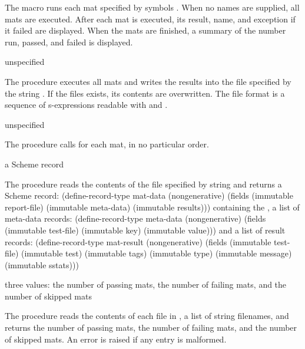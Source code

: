 The  macro runs each mat specified by symbols
 \etc.  When no names are supplied, all
mats are executed.  After each mat is executed, its result, name, and
exception if it failed are displayed.  When the mats are finished, a
summary of the number run, passed, and failed is displayed.

\begin{procedure}
\end{procedure}
\returns{} unspecified

The  procedure executes all mats and writes
the results into the file specified by the string . If
the files exists, its contents are overwritten. The file format is a
sequence of s-expressions readable with  and
.

\begin{procedure}
\end{procedure}
\returns{} unspecified

The  procedure calls  for each mat, in no particular order.

\begin{procedure}
\end{procedure}
\returns{} a Scheme record

The  procedure reads the contents of the file
specified by string  and returns a Scheme record:
\codebegin
(define-record-type mat-data
  (nongenerative)
  (fields
    (immutable report-file)
    (immutable meta-data)
    (immutable results)))
\codeend
containing the , a list of meta-data records:
\codebegin
(define-record-type meta-data
  (nongenerative)
  (fields
   (immutable test-file)
   (immutable key)
   (immutable value)))
\codeend
and a list of result records:
\codebegin
(define-record-type mat-result
  (nongenerative)
  (fields
   (immutable test-file)
   (immutable test)
   (immutable tags)
   (immutable type)
   (immutable message)
   (immutable sstats)))
\codeend

\begin{procedure}
\end{procedure}
\returns{} three values: the number of passing mats, the number of
failing mats, and the number of skipped mats

The  procedure reads the contents of each file in
, a list of string filenames, and returns the number of
passing mats, the number of failing mats, and the number of skipped mats.
An error is raised if any
entry is malformed.
